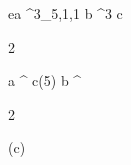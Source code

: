 \begin{eqcode}{e}{a }{^3_{5,1,1}}{}
  b \in {}^3 \lend
  c \gets
  \begin{tmatrix}
  2  \lend
  \end{tmatrix} \lend
  a \gets \genar \limits ^ {c}(5) \lend %
  b \gets \genar \limits ^ {  \begin{tmatrix}
  2  \lend
  \end{tmatrix} }(c) \lend 
\end{eqcode}
